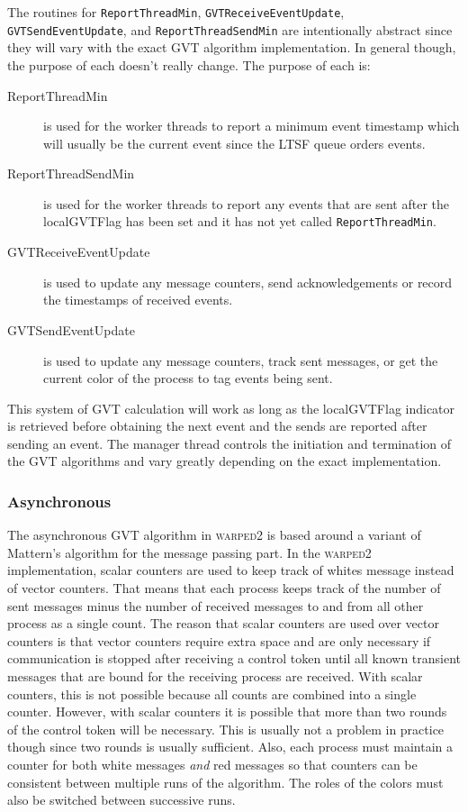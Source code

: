 \documentclass[11pt]{book}
\begin{document}
The routines for \texttt{ReportThreadMin}, \texttt{GVTReceiveEventUpdate}, \texttt{GVTSendEventUpdate},
and \texttt{ReportThreadSendMin} are intentionally abstract since they will vary with the exact
GVT algorithm implementation.  In general though, the purpose of each doesn't really change.  The
purpose of each is:

\begin{description}
    \item[ReportThreadMin ] is used for the worker threads to report a minimum event timestamp
        which will usually be the current event since the LTSF queue orders events.
    \item[ReportThreadSendMin ] is used for the worker threads to report any events that are sent
        after the localGVTFlag has been set and it has not yet called \texttt{ReportThreadMin}.
    \item[GVTReceiveEventUpdate ] is used to update any message counters, send acknowledgements or
        record the timestamps of received events.  
    \item[GVTSendEventUpdate ] is used to update any message counters, track sent messages, or get
        the current color of the process to tag events being sent.
\end{description}

This system of GVT calculation will work as long as the localGVTFlag indicator is retrieved before
obtaining the next event and the sends are reported after sending an event.  The manager thread
controls the initiation and termination of the GVT algorithms and vary greatly depending on
the exact implementation.

\subsubsection{Asynchronous}

The asynchronous GVT algorithm in \textsc{warped2} is based around a variant of Mattern's
algorithm for the message passing part.  In the \textsc{warped2} implementation, scalar counters
are used to keep track of whites message instead of vector counters.  That means that
each process keeps track of the number of sent messages minus the number of received messages
to and from all other process as a single count.  The reason that scalar counters are used over
vector counters is that vector counters require extra space and are only necessary if communication
is stopped after receiving a control token until all known transient messages that are bound for
the receiving process are received.  With scalar counters, this is not possible because all counts
are combined into a single counter.  However, with scalar counters it is possible that more than
two rounds of the control token will be necessary.  This is usually not a problem in practice
though since two rounds is usually sufficient.  Also, each process must maintain a counter for
both white messages \emph{and} red messages so that counters can be consistent between multiple
runs of the algorithm.  The roles of the colors must also be switched between successive runs.
\end{document}
